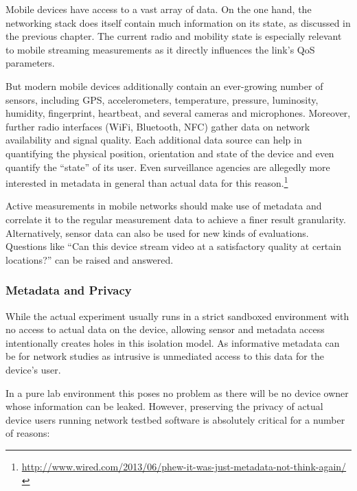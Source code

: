 Mobile devices have access to a vast array of data. On the one hand, the networking stack does itself contain much information on its state, as discussed in the previous chapter. The current radio and mobility state is especially relevant to mobile streaming measurements as it directly influences the link's \gls{QoS} parameters. 

But modern mobile devices additionally contain an ever-growing number of sensors, including \gls{GPS}, accelerometers, temperature, pressure, luminosity, humidity, fingerprint, heartbeat, and several cameras and microphones. Moreover, further radio interfaces (WiFi, Bluetooth, \acrshort{NFC}) gather data on network availability and signal quality. Each additional data source can help in quantifying the physical position, orientation and state of the device and even quantify the ``state'' of its user. Even surveillance agencies are allegedly more interested in metadata in general than actual data for this reason.\footnote{\url{http://www.wired.com/2013/06/phew-it-was-just-metadata-not-think-again/}}

Active measurements in mobile networks should make use of metadata and correlate it to the regular measurement data to achieve a finer result granularity. Alternatively, sensor data can also be used for new kinds of evaluations. Questions like ``Can this device stream video at a satisfactory quality at certain locations?'' can be raised and answered.


\subsubsection{Metadata and Privacy}

While the actual experiment usually runs in a strict sandboxed environment with no access to actual data on the device, allowing sensor and metadata access intentionally creates holes in this isolation model. As informative metadata can be for network studies as intrusive is unmediated access to this data for the device's user.

In a pure lab environment this poses no problem as there will be no device owner whose information can be leaked. However, preserving the privacy of actual device users running network testbed software is absolutely critical for a number of reasons:


